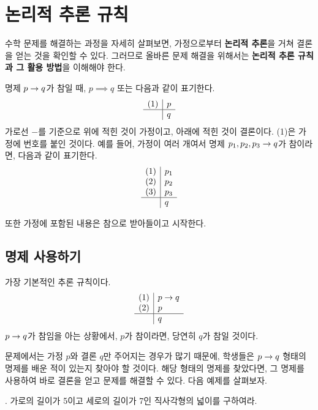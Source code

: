 \chapter{논리적 추론 규칙}

수학 문제를 해결하는 과정을 자세히 살펴보면, 가정으로부터 \textbf{논리적 추론}을 거쳐 결론을 얻는 것을 확인할 수 있다. 그러므로 올바른 문제 해결을 위해서는 \textbf{논리적 추론 규칙과 그 활용 방법}을 이해해야 한다.

명제 \(p \rightarrow q\)가 참일 때, \(p \implies q\) 또는 다음과 같이 표기한다.
\[
    \begin{array}{c|l}
        (1) & p \\\hline & q
    \end{array}
\]
가로선 \(-\)를 기준으로 위에 적힌 것이 가정이고, 아래에 적힌 것이 결론이다. (1)은 가정에 번호를 붙인 것이다. 예를 들어, 가정이 여러 개여서 명제 \(p_1, p_2, p_3 \rightarrow q\)가 참이라면, 다음과 같이 표기한다.
\[
    \begin{array}{c|l}
        (1) & p_1 \\ (2) & p_2 \\ (3) & p_3 \\\hline & q
    \end{array}
\]

또한 가정에 포함된 내용은 참으로 받아들이고 시작한다.

\pagebreak

\section{명제 사용하기}

가장 기본적인 추론 규칙이다.
\[
    \begin{array}{c|l}
        (1) & p \rightarrow q \\ (2) & p \\\hline & q
    \end{array}
\]
\(p \rightarrow q\)가 참임을 아는 상황에서, \(p\)가 참이라면, 당연히 \(q\)가 참일 것이다.

문제에서는 가정 \(p\)와 결론 \(q\)만 주어지는 경우가 많기 때문에, 학생들은 \(p \rightarrow q\) 형태의 명제를 배운 적이 있는지 찾아야 할 것이다. 해당 형태의 명제를 찾았다면, 그 명제를 사용하여 바로 결론을 얻고 문제를 해결할 수 있다. 다음 예제를 살펴보자.

\bigskip

\ex. 가로의 길이가 5이고 세로의 길이가 7인 직사각형의 넓이를 구하여라.

